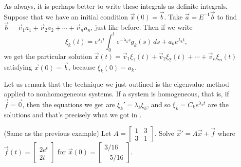 \documentclass{ximera}
\begin{document}
As always, it is perhaps better to write these integrals as definite integrals. Suppose that we have an initial condition $\vec{x}(0) = \vec{b}$. Take $\vec{a} = E^{-1} \vec{b}$ to find $\vec{b} = \vec{v}_1 a_1 + \vec{v}_2 a_2 + \cdots + \vec{v}_n a_n$, just like before. Then if we write 
\begin{equation*}
    \xi_k(t) =  e^{\lambda_k t} 
    \int_0^t e^{-\lambda_k s} g_k(s) \,ds + a_k e^{\lambda_k t} ,
\end{equation*}
we get the particular solution $\vec{x}(t) = \vec{v}_1 \xi_1(t) +  \vec{v}_2 \xi_2(t) + \cdots + \vec{v}_n \xi_n(t)$ satisfying $\vec{x}(0) = \vec{b}$, because $\xi_k(0) = a_k$.

Let us remark that the technique we just outlined is the eigenvalue method applied to nonhomogeneous systems.  If a system is homogeneous, that is, if $\vec{f}=\vec{0}$, then the equations we get are $\xi_k' = \lambda_k \xi_k$, and so $\xi_k = C_k e^{\lambda_k t}$ are the solutions and that's precisely what we got in .


\begin{example} (Same as the previous example)
    Let 
    $A = \left[ \begin{smallmatrix}
        1 & 3 \\
        3 & 1
    \end{smallmatrix} \right]$.
    Solve ${\vec{x}}' = A \vec{x} + \vec{f}$ where $\vec{f}(t) = 
    \left[ \begin{smallmatrix}
        2e^t \\
        2t
    \end{smallmatrix} \right]$ 
    for 
    $\vec{x}(0) = \left[ \begin{smallmatrix}
        3/16 \\
        -5/16
    \end{smallmatrix} \right]$.
\end{example}
\end{document}
